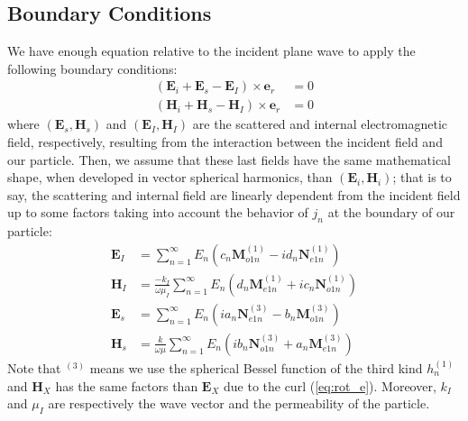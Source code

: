 \documentclass{article}
\numberwithin{equation}{section}
\begin{document}
\subsection{Boundary Conditions}

We have enough equation relative to the incident plane wave to apply the following boundary conditions:
\begin{align}\label{eq:boundaries}
(\textbf{E}_{i} + \textbf{E}_{s} - \textbf{E}_{I}) \times \textbf{e}_{r} &= 0\\
(\textbf{H}_{i} + \textbf{H}_{s} - \textbf{H}_{I}) \times \textbf{e}_{r} &= 0
\end{align}
where $(\textbf{E}_{s}, \textbf{H}_{s})$ and $(\textbf{E}_{I}, \textbf{H}_{I})$ are the scattered and internal electromagnetic field, respectively, resulting from the interaction between the incident field and our particle. Then, we assume that these last fields have the same mathematical shape, when developed in vector spherical harmonics, than $(\textbf{E}_{i}, \textbf{H}_{i})$; that is to say, the scattering and internal field are linearly dependent from the incident field up to some factors taking into account the behavior of $j_{n}$ at the boundary of our particle:
\begin{align}
\textbf{E}_{I}&=\sum_{n=1}^{\infty }E_{n}(c_{n}\textbf{M}^{(1)}_{o1n} - id_{n}\textbf{N}^{(1)}_{e1n})\\
\textbf{H}_{I}&=\frac{-k_{I}}{\omega\mu_{I}}\sum_{n=1}^{\infty }E_{n}(d_{n}\textbf{M}^{(1)}_{e1n} + ic_{n}\textbf{N}^{(1)}_{o1n})\\
\textbf{E}_{s}&=\sum_{n=1}^{\infty }E_{n}(ia_{n}\textbf{N}^{(3)}_{e1n} - b_{n}\textbf{M}^{(3)}_{o1n})\\
\textbf{H}_{s}&=\frac{k}{\omega\mu}\sum_{n=1}^{\infty }E_{n}(ib_{n}\textbf{N}^{(3)}_{o1n} + a_{n}\textbf{M}^{(3)}_{e1n})
\end{align}
Note that $^{(3)}$ means we use the spherical Bessel function of the third kind $h^{(1)}_{n}$ and $\textbf{H}_{X}$ has the same factors than $\textbf{E}_{X}$ due to the curl (\ref{eq:rot_e}). Moreover, $k_{I}$ and $\mu_{I}$ are respectively the wave vector and the permeability of the particle.
\end{document}
